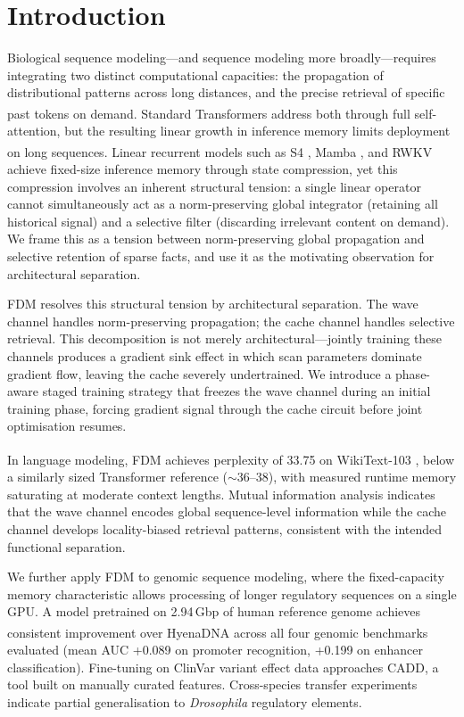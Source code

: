 \documentclass{article}
\newcommand{\citenum}[1]{%
  \textsuperscript{\rmfamily\upshape[#1]}}
\begin{document}
\section{Introduction}

Biological sequence modeling---and sequence modeling more broadly---requires
integrating two distinct computational capacities: the propagation of
distributional patterns across long distances, and the precise retrieval
of specific past tokens on demand.
Standard Transformers\citenum{3} address both through full self-attention,
but the resulting linear growth in inference memory limits deployment on
long sequences.
Linear recurrent models such as S4\citenum{4}, Mamba\citenum{5}, and
RWKV\citenum{6} achieve fixed-size inference memory through state
compression, yet this compression involves an inherent structural tension:
a single linear operator cannot simultaneously act as a norm-preserving
global integrator (retaining all historical signal) and a selective filter
(discarding irrelevant content on demand).
We frame this as a tension between norm-preserving global propagation and
selective retention of sparse facts, and use it as the motivating
observation for architectural separation.

FDM resolves this structural tension by architectural separation.
The wave channel handles norm-preserving propagation; the cache channel
handles selective retrieval.
This decomposition is not merely architectural---jointly training these
channels produces a gradient sink effect in which scan parameters
dominate gradient flow, leaving the cache severely undertrained.
We introduce a phase-aware staged training strategy that freezes the
wave channel during an initial training phase, forcing gradient signal
through the cache circuit before joint optimisation resumes.

In language modeling, FDM achieves perplexity of 33.75 on
WikiText-103\citenum{1}, below a similarly sized Transformer reference
($\sim$36--38), with measured runtime memory saturating at moderate
context lengths.
Mutual information analysis indicates that the wave channel encodes
global sequence-level information while the cache channel develops
locality-biased retrieval patterns, consistent with the intended
functional separation.

We further apply FDM to genomic sequence modeling, where the
fixed-capacity memory characteristic allows processing of longer
regulatory sequences on a single GPU.
A model pretrained on 2.94\,Gbp of human reference genome achieves
consistent improvement over HyenaDNA\citenum{2} across all four genomic
benchmarks evaluated (mean AUC +0.089 on promoter recognition, +0.199
on enhancer classification).
Fine-tuning on ClinVar variant effect data approaches CADD, a tool
built on manually curated features.
Cross-species transfer experiments indicate partial generalisation to
\emph{Drosophila} regulatory elements.
\end{document}
